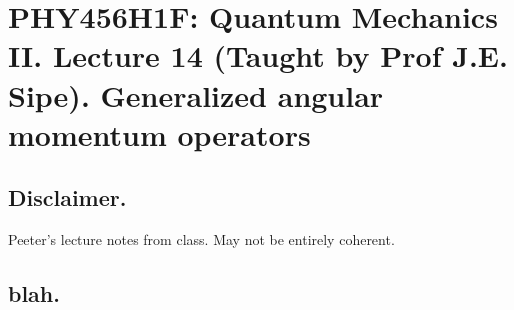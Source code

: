 
%

\chapter{PHY456H1F: Quantum Mechanics II.  Lecture 14 (Taught by Prof J.E. Sipe).  Generalized angular momentum operators}
\label{chap:qmTwoL14}
{}
\date{Oct 26, 2011}

\beginArtWithToc

\section{Disclaimer.}

Peeter's lecture notes from class.  May not be entirely coherent.

\section{blah.}

\cite{desai2009quantum}

\EndArticle
